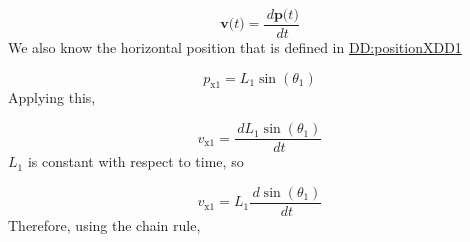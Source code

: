 \documentclass[12pt]{article}
\begin{document}
\begin{displaymath}
\symbf{v}\text{(}t\text{)}=\frac{\,d\symbf{p}\text{(}t\text{)}}{\,dt}
\end{displaymath}
We also know the horizontal position that is defined in \hyperref[DD:positionXDD1]{DD:positionXDD1}

\begin{displaymath}
{p_{\text{x}1}}={L_{1}} \sin\left({θ_{1}}\right)
\end{displaymath}
Applying this,

\begin{displaymath}
{v_{\text{x}1}}=\frac{\,d{L_{1}} \sin\left({θ_{1}}\right)}{\,dt}
\end{displaymath}
${L_{1}}$ is constant with respect to time, so

\begin{displaymath}
{v_{\text{x}1}}={L_{1}} \frac{\,d\sin\left({θ_{1}}\right)}{\,dt}
\end{displaymath}
Therefore, using the chain rule,
\end{document}
